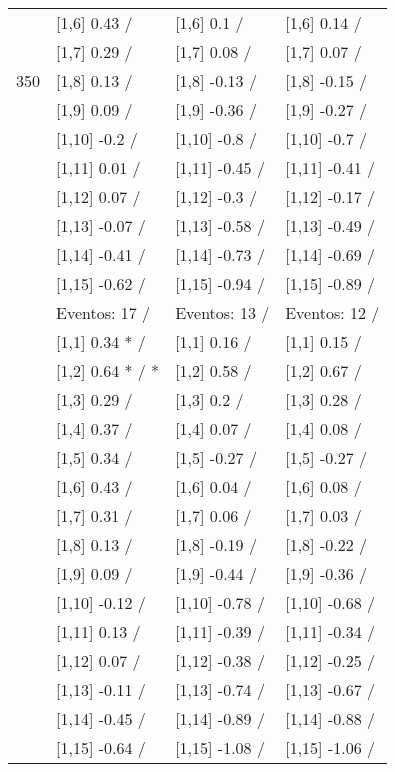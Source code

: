 \begin{table}
\begin{tabular}[t]{llll}
 & {}[1,6] 0.43  / & {}[1,6] 0.1  / & {}[1,6] 0.14  /\\
 & {}[1,7] 0.29  / & {}[1,7] 0.08  / & {}[1,7] 0.07  /\\
350 & {}[1,8] 0.13  / & {}[1,8] -0.13  / & {}[1,8] -0.15  /\\
\addlinespace
 & {}[1,9] 0.09  / & {}[1,9] -0.36  / & {}[1,9] -0.27  /\\
 & {}[1,10] -0.2  / & {}[1,10] -0.8  / & {}[1,10] -0.7  /\\
 & {}[1,11] 0.01  / & {}[1,11] -0.45  / & {}[1,11] -0.41  /\\
 & {}[1,12] 0.07  / & {}[1,12] -0.3  / & {}[1,12] -0.17  /\\
 & {}[1,13] -0.07  / & {}[1,13] -0.58  / & {}[1,13] -0.49  /\\
\addlinespace
 & {}[1,14] -0.41  / & {}[1,14] -0.73  / & {}[1,14] -0.69  /\\
 & {}[1,15] -0.62  / & {}[1,15] -0.94  / & {}[1,15] -0.89  /\\
 & Eventos:  17 / & Eventos:  13 / & Eventos:  12 /\\
 & {}[1,1] 0.34 * / & {}[1,1] 0.16  / & {}[1,1] 0.15  /\\
 & {}[1,2] 0.64 * / * & {}[1,2] 0.58  / & {}[1,2] 0.67  /\\
\addlinespace
 & {}[1,3] 0.29  / & {}[1,3] 0.2  / & {}[1,3] 0.28  /\\
 & {}[1,4] 0.37  / & {}[1,4] 0.07  / & {}[1,4] 0.08  /\\
 & {}[1,5] 0.34  / & {}[1,5] -0.27  / & {}[1,5] -0.27  /\\
 & {}[1,6] 0.43  / & {}[1,6] 0.04  / & {}[1,6] 0.08  /\\
 & {}[1,7] 0.31  / & {}[1,7] 0.06  / & {}[1,7] 0.03  /\\
\addlinespace
500 & {}[1,8] 0.13  / & {}[1,8] -0.19  / & {}[1,8] -0.22  /\\
 & {}[1,9] 0.09  / & {}[1,9] -0.44  / & {}[1,9] -0.36  /\\
 & {}[1,10] -0.12  / & {}[1,10] -0.78  / & {}[1,10] -0.68  /\\
 & {}[1,11] 0.13  / & {}[1,11] -0.39  / & {}[1,11] -0.34  /\\
 & {}[1,12] 0.07  / & {}[1,12] -0.38  / & {}[1,12] -0.25  /\\
\addlinespace
 & {}[1,13] -0.11  / & {}[1,13] -0.74  / & {}[1,13] -0.67  /\\
 & {}[1,14] -0.45  / & {}[1,14] -0.89  / & {}[1,14] -0.88  /\\
 & {}[1,15] -0.64  / & {}[1,15] -1.08  / & {}[1,15] -1.06  /\\
\bottomrule
\end{tabular}
\end{table}
